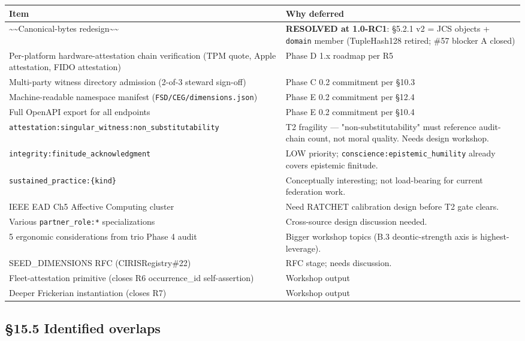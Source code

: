\documentclass[10pt]{article}
\begin{document}
{\footnotesize
\begin{longtable}{|p{8.0cm}|p{8.0cm}|}\hline
\textbf{Item} & \textbf{Why deferred} \\ \hline\endhead
\textasciitilde{}\textasciitilde{}Canonical-bytes redesign\textasciitilde{}\textasciitilde{} & \textbf{RESOLVED at 1.0-RC1}: §5.2.1 v2 = JCS objects + \texttt{domain} member (TupleHash128 retired; \#57 blocker A closed) \\ \hline
Per-platform hardware-attestation chain verification (TPM quote, Apple attestation, FIDO attestation) & Phase D 1.x roadmap per R5 \\ \hline
Multi-party witness directory admission (2-of-3 steward sign-off) & Phase C 0.2 commitment per §10.3 \\ \hline
Machine-readable namespace manifest (\texttt{FSD/CEG/dimensions.json}) & Phase E 0.2 commitment per §12.4 \\ \hline
Full OpenAPI export for all endpoints & Phase E 0.2 commitment per §10.4 \\ \hline
\texttt{attestation:singular\_witness:non\_substitutability} & T2 fragility — "non-substitutability" must reference audit-chain count, not moral quality. Needs design workshop. \\ \hline
\texttt{integrity:finitude\_acknowledgment} & LOW priority; \texttt{conscience:epistemic\_humility} already covers epistemic finitude. \\ \hline
\texttt{sustained\_practice:\{kind\}} & Conceptually interesting; not load-bearing for current federation work. \\ \hline
IEEE EAD Ch5 Affective Computing cluster & Need RATCHET calibration design before T2 gate clears. \\ \hline
Various \texttt{partner\_role:*} specializations & Cross-source design discussion needed. \\ \hline
5 ergonomic considerations from trio Phase 4 audit & Bigger workshop topics (B.3 deontic-strength axis is highest-leverage). \\ \hline
SEED\_DIMENSIONS RFC (CIRISRegistry\#22) & RFC stage; needs discussion. \\ \hline
Fleet-attestation primitive (closes R6 occurrence\_id self-assertion) & Workshop output \\ \hline
Deeper Frickerian instantiation (closes R7) & Workshop output \\ \hline
\end{longtable}}


\subsection*{§15.5 Identified overlaps}
\end{document}
